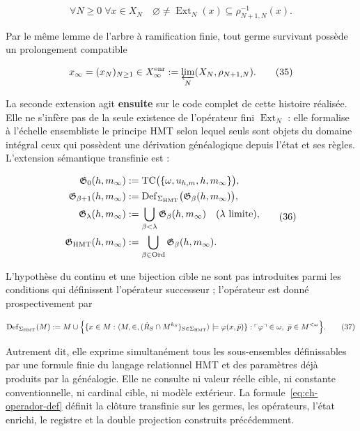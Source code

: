 \[
 \forall N\ge0\;\forall x\in X_N\quad
 \varnothing\ne\operatorname{Ext}_N(x)
 \subseteq\rho_{N+1,N}^{-1}(x).
\tag{34}\label{eq:ch-extension-no-vacia}
\]

Par le même lemme de l’arbre à ramification finie, tout germe survivant
possède un prolongement compatible

\[
 x_\infty=(x_N)_{N\ge1}\in
 X_\infty^{\rm enr}:=\varprojlim_N(X_N,\rho_{N+1,N}).
\tag{35}\label{eq:ch-limite-inverso}
\]

La seconde extension agit \textbf{ensuite} sur le code complet de cette
histoire réalisée.
Elle ne s’infère pas de la seule existence de l’opérateur fini
\(\operatorname{Ext}_N\) : elle formalise à l’échelle ensembliste le principe HMT selon
lequel seuls sont objets du domaine intégral ceux qui possèdent une dérivation
généalogique depuis l’état et ses règles. L’extension sémantique transfinie
est :

\[
 \begin{aligned}
  \mathfrak G_0(h,m_\infty)
  &:=\operatorname{TC}\bigl(\{\omega,u_{h,m},h,m_\infty\}\bigr),\\
  \mathfrak G_{\beta+1}(h,m_\infty)
  &:=\operatorname{Def}_{\Sigma_{\rm HMT}}
       \bigl(\mathfrak G_\beta(h,m_\infty)\bigr),\\
  \mathfrak G_\lambda(h,m_\infty)
  &:=\bigcup_{\beta<\lambda}\mathfrak G_\beta(h,m_\infty)
       \quad(\lambda\text{ limite}),\\
  \mathfrak G_{\rm HMT}(h,m_\infty)
  &:=\bigcup_{\beta\in\operatorname{Ord}}
       \mathfrak G_\beta(h,m_\infty).
 \end{aligned}
\tag{36}\label{eq:ch-clausura-transfinita}
\]

L'hypothèse du continu et une bijection cible ne sont pas introduites parmi les conditions qui définissent l'opérateur successeur ; l'opérateur est donné prospectivement par

\[
 \operatorname{Def}_{\Sigma_{\rm HMT}}(M)
 :=M\cup
 \Bigl\{
   \{x\in M:\langle M,\in,
       (\dot R_S\cap M^{k_S})_{S\in\Sigma_{\rm HMT}}\rangle
       \models\varphi(x,\bar p)\}:
   \ulcorner\varphi\urcorner\in\omega,
   \ \bar p\in M^{<\omega}
 \Bigr\}.
\tag{37}\label{eq:ch-operador-def}
\]

Autrement dit, elle exprime simultanément tous les sous-ensembles définissables par une formule finie du langage relationnel HMT et des paramètres déjà produits par la généalogie. Elle ne consulte ni valeur réelle cible, ni constante conventionnelle, ni cardinal cible, ni modèle extérieur. La formule~\eqref{eq:ch-operador-def} définit la clôture transfinie sur les germes, les opérateurs, l'état enrichi, le registre et la double projection construits précédemment.

